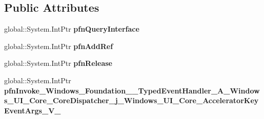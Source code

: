 \subsection*{Public Attributes}
\begin{DoxyCompactItemize}
\item 
\mbox{\label{struct_windows_1_1_foundation_1_1_typed_event_handler___a___windows___u_i___core___core_dispatch3f137e4e492cef082f78b8aa53fc2fe8_a405e6ba19fc1b3172ee3fcbd69d4dfe0}} 
global\+::\+System.\+Int\+Ptr {\bfseries pfn\+Query\+Interface}
\item 
\mbox{\label{struct_windows_1_1_foundation_1_1_typed_event_handler___a___windows___u_i___core___core_dispatch3f137e4e492cef082f78b8aa53fc2fe8_adbeb421fb9a0f601accfef79d9bf98ab}} 
global\+::\+System.\+Int\+Ptr {\bfseries pfn\+Add\+Ref}
\item 
\mbox{\label{struct_windows_1_1_foundation_1_1_typed_event_handler___a___windows___u_i___core___core_dispatch3f137e4e492cef082f78b8aa53fc2fe8_a09036b67767c8a4abe484ee28d2fe91f}} 
global\+::\+System.\+Int\+Ptr {\bfseries pfn\+Release}
\item 
\mbox{\label{struct_windows_1_1_foundation_1_1_typed_event_handler___a___windows___u_i___core___core_dispatch3f137e4e492cef082f78b8aa53fc2fe8_a8b61acb14c2a185075c206f1a19a1a7f}} 
global\+::\+System.\+Int\+Ptr {\bfseries pfn\+Invoke\+\_\+\+Windows\+\_\+\+Foundation\+\_\+\+\_\+\+Typed\+Event\+Handler\+\_\+\+A\+\_\+\+Windows\+\_\+\+U\+I\+\_\+\+Core\+\_\+\+Core\+Dispatcher\+\_\+j\+\_\+\+Windows\+\_\+\+U\+I\+\_\+\+Core\+\_\+\+Accelerator\+Key\+Event\+Args\+\_\+\+V\+\_\+}
\end{DoxyCompactItemize}

